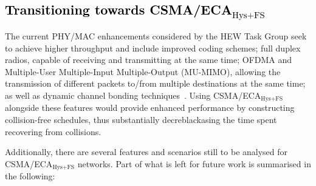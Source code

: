 
\textcolor{black}{\section{Transitioning towards CSMA/ECA$_{\text{Hys+FS}}$}\label{ECAtoCA}}


The current PHY/MAC enhancements considered by the HEW Task Group seek to achieve higher throughput and include improved coding schemes; full duplex radios, capable of receiving and transmitting at the same time; OFDMA and Multiple-User Multiple-Input Multiple-Output (MU-MIMO), allowing the transmission of different packets to/from multiple destinations at the same time; as well as dynamic channel bonding techniques~\cite{BorisChannelBonding}. Using CSMA/ECA$_{\text{Hys+FS}}$ alongside these features would provide enhanced performance by constructing collision-free schedules, thus substantially decre{black}asing the time spent recovering from collisions. 



Additionally, there are several features and scenarios still to be analysed for CSMA/ECA$_{\text{Hys+FS}}$ networks. Part of what is left for future work is summarised in the following:

